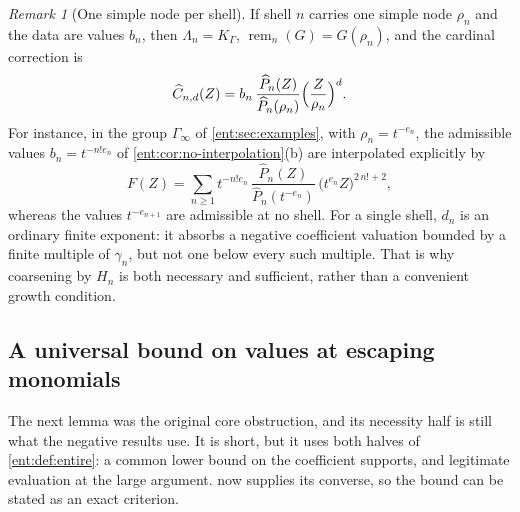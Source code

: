 \documentclass[11pt]{article}
\theoremstyle{plain}
\theoremstyle{plain}
\theoremstyle{plain}
\theoremstyle{definition}
\theoremstyle{definition}
\theoremstyle{definition}
\theoremstyle{definition}
\theoremstyle{remark}
\newtheorem{remark}[remark]{Remark}
\newcommand{\K}{K_\Gamma}\newcommand{\KD}{K_\Delta}
\DeclareMathOperator{\remp}{rem}\DeclareMathOperator{\Res}{Res}
\begin{document}
\begin{remark}[One simple node per shell]\label{ent:sm:rem:simple-cardinal}
If shell $n$ carries one simple node $\rho_n$ and the data are values $b_n$,
then $\Lambda_n=\K$, $\remp_n(G)=G(\rho_n)$, and the cardinal correction is
\[
 \widehat C_{n,d}(Z)=b_n\,\frac{\widehat P_n(Z)}{\widehat P_n(\rho_n)}
 \Bigl(\frac Z{\rho_n}\Bigr)^{d}.
\]
For instance, in the group $\Gamma_\infty$ of \cref{ent:sec:examples}, with
$\rho_n=t^{-e_n}$, the admissible values $b_n=t^{-n!e_n}$ of
\cref{ent:cor:no-interpolation}(b) are interpolated explicitly by
\[
 F(Z)=\sum_{n\ge1}t^{-n!e_n}\,
 \frac{\widehat P_n(Z)}{\widehat P_n(t^{-e_n})}\,
 \bigl(t^{e_n}Z\bigr)^{2\,n!+2},
\]
whereas the values $t^{-e_{n+1}}$ are admissible at no shell. For a single
shell, $d_n$ is an ordinary finite exponent: it absorbs a negative coefficient
valuation bounded by a finite multiple of $\gamma_n$, but not one below every
such multiple. That is why coarsening by $H_n$ is both necessary and
sufficient, rather than a convenient growth condition.
\end{remark}

\subsection{A universal bound on values at escaping monomials}
The next lemma was the original core obstruction, and its necessity half is
still what the negative results use. It is short, but it uses both halves of
\cref{ent:def:entire}: a common lower bound on the coefficient supports, and
legitimate evaluation at the large argument.  now
supplies its converse, so the bound can be stated as an exact criterion.
\end{document}
